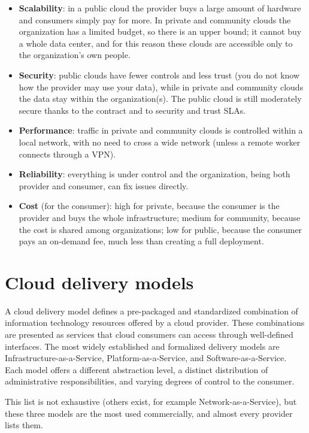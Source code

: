 \begin{itemize}
	\item \textbf{Scalability}: in a public cloud the provider buys a large amount of hardware and consumers simply pay for more. In private and community clouds the organization has a limited budget, so there is an upper bound; it cannot buy a whole data center, and for this reason these clouds are accessible only to the organization's own people.
	\item \textbf{Security}: public clouds have fewer controls and less trust (you do not know how the provider may use your data), while in private and community clouds the data stay within the organization(s). The public cloud is still moderately secure thanks to the contract and to security and trust SLAs.
	\item \textbf{Performance}: traffic in private and community clouds is controlled within a local network, with no need to cross a wide network (unless a remote worker connects through a VPN).
	\item \textbf{Reliability}: everything is under control and the organization, being both provider and consumer, can fix issues directly.
	\item \textbf{Cost} (for the consumer): high for private, because the consumer is the provider and buys the whole infrastructure; medium for community, because the cost is shared among organizations; low for public, because the consumer pays an on-demand fee, much less than creating a full deployment.
\end{itemize}

\section{Cloud delivery models}

A cloud delivery model defines a pre-packaged and standardized combination of information technology resources offered by a cloud provider. These combinations are presented as services that cloud consumers can access through well-defined interfaces. The most widely established and formalized delivery models are Infrastructure-as-a-Service, Platform-as-a-Service, and Software-as-a-Service. Each model offers a different abstraction level, a distinct distribution of administrative responsibilities, and varying degrees of control to the consumer.

This list is not exhaustive (others exist, for example Network-as-a-Service), but these three models are the most used commercially, and almost every provider lists them.


